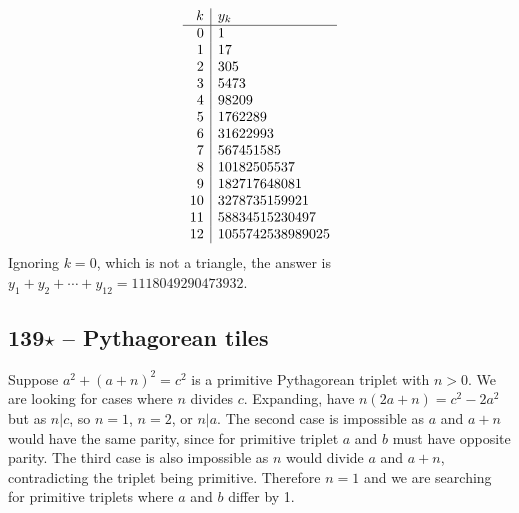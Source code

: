 \documentclass{article}
\begin{document}
\begin{align*}
	\begin{array}{r | l }
	k & y_k \\ \hline
	0 & 1 \\ 
	1 & 17 \\
	2 & 305 \\
	3 & 5473 \\
	4 & 98209 \\
	5 & 1762289 \\
	6 & 31622993 \\
	7 & 567451585 \\
	8 & 10182505537 \\
	9 & 182717648081 \\
	10 & 3278735159921 \\
	11 & 58834515230497 \\
	12 & 1055742538989025
	\end{array}
\end{align*}
Ignoring $k=0$, which is not a triangle, the answer is $y_1 + y_2 + \cdots + y_{12} = \boxed{1118049290473932}$.

\subsection*{139$\star$ -- Pythagorean tiles} 
Suppose $a^2 + (a+n)^2 = c^2$ is a primitive Pythagorean triplet with $n > 0$. 
We are looking for cases where $n$ divides $c$. 
Expanding, have $n(2a +n) = c^2 - 2a^2$ but as $n|c$, so $n=1$, $n=2$, or $n|a$. 
The second case is impossible as $a$ and $a+n$ would have the same parity, since for primitive triplet $a$ and $b$ must have opposite parity.
The third case is also impossible as $n$ would divide $a$ and $a+n$, contradicting the triplet being primitive.
Therefore $n=1$ and we are searching for primitive triplets where $a$ and $b$ differ by 1. \\
\end{document}
